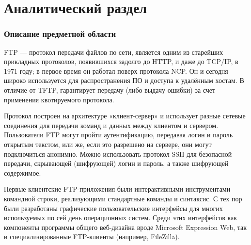 \section{Аналитический раздел}
\subsubsection{Описание предметной области}
FTP — протокол передачи файлов по сети, является одним из старейших прикладных протоколов, появившихся задолго до HTTP, и даже до TCP/IP, в 1971 году; в первое время он работал поверх протокола NCP. 
Он и сегодня широко используется для распространения ПО и доступа к удалённым хостам. 
В отличие от TFTP, гарантирует передачу (либо выдачу ошибки) за счет применения квотируемого протокола.

Протокол построен на архитектуре «клиент-сервер» и использует разные сетевые соединения для передачи команд и данных между клиентом и сервером. 
Пользователи FTP могут пройти аутентификацию, передавая логин и пароль открытым текстом, или же, если это разрешено на сервере, они могут подключиться анонимно. 
Можно использовать протокол SSH для безопасной передачи, скрывающей (шифрующей) логин и пароль, а также шифрующей содержимое.

Первые клиентские FTP-приложения были интерактивными инструментами командной строки, реализующими стандартные команды и синтаксис. 
С тех пор были разработаны графические пользовательские интерфейсы для многих используемых по сей день операционных систем. 
Среди этих интерфейсов как компоненты программы общего веб-дизайна вроде Microsoft Expression Web, так и специализированные FTP-клиенты (например, FileZilla).

